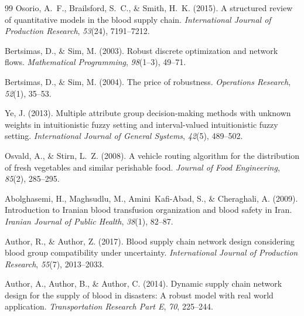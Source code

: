 \documentclass[10pt,twocolumn]{article}
\begin{document}
\begin{thebibliography}{99}
Osorio, A.~F., Brailsford, S.~C., \& Smith, H.~K. (2015).
A structured review of quantitative models in the blood supply chain.
\textit{International Journal of Production Research},
\textit{53}(24), 7191--7212.

Bertsimas, D., \& Sim, M. (2003).
Robust discrete optimization and network flows.
\textit{Mathematical Programming},
\textit{98}(1--3), 49--71.

Bertsimas, D., \& Sim, M. (2004).
The price of robustness.
\textit{Operations Research},
\textit{52}(1), 35--53.

Ye, J. (2013).
Multiple attribute group decision-making methods with unknown
weights in intuitionistic fuzzy setting and interval-valued
intuitionistic fuzzy setting.
\textit{International Journal of General Systems},
\textit{42}(5), 489--502.

Osvald, A., \& Stirn, L.~Z. (2008).
A vehicle routing algorithm for the distribution of fresh vegetables
and similar perishable food.
\textit{Journal of Food Engineering},
\textit{85}(2), 285--295.

Abolghasemi, H., Maghsudlu, M., Amini~Kafi-Abad, S.,
\& Cheraghali, A. (2009).
Introduction to Iranian blood transfusion organization and blood
safety in Iran.
\textit{Iranian Journal of Public Health},
\textit{38}(1), 82--87.

Author, R., \& Author, Z. (2017).
Blood supply chain network design considering blood group
compatibility under uncertainty.
\textit{International Journal of Production Research},
\textit{55}(7), 2013--2033.

Author, A., Author, B., \& Author, C. (2014).
Dynamic supply chain network design for the supply of blood in
disasters: A robust model with real world application.
\textit{Transportation Research Part E},
\textit{70}, 225--244.

\end{thebibliography}
\end{document}
